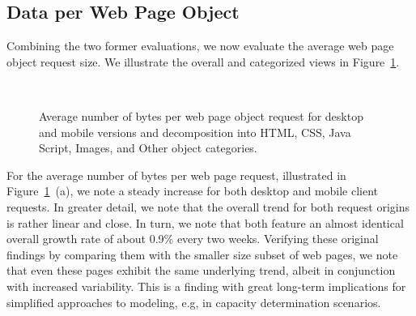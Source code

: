 \documentclass[journal,final]{IEEEtran}
\begin{document}
\subsection{Data per Web Page Object}
Combining the two former evaluations, we now evaluate the average web page object request size.
We illustrate the overall and categorized views in Figure~\ref{fig:relative}.
\begin{figure}[]
	\centering
	\\
	\qquad
	\caption{Average number of bytes per web page object request for desktop and mobile versions and decomposition into  HTML, CSS, Java Script, Images, and Other object categories.\label{fig:relative}}
\end{figure}
For the average number of bytes per web page request, illustrated in Figure~\ref{fig:relative}~(a), we note a steady increase for both desktop and mobile client requests. 
In greater detail, we note that the overall trend for both request origins is rather linear and close.
In turn, we note that both feature an almost identical overall growth rate of about 0.9\% every two weeks.
Verifying these original findings by comparing them with the smaller size subset of web pages, we note that even these pages exhibit the same underlying trend, albeit in conjunction with increased variability.
This is a finding with great long-term implications for simplified approaches to modeling, e.g, in capacity determination scenarios.
\end{document}
